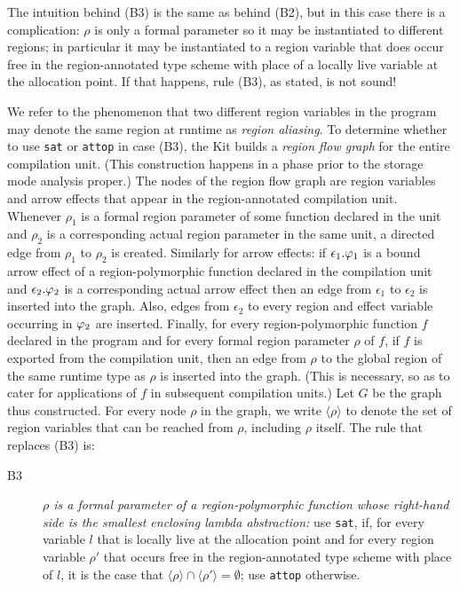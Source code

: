 \documentclass[12pt]{book}
\begin{document}
The intuition behind (B3) is the same as behind (B2), but
in this case there is a complication: 
$\rho$ is only a formal parameter so it may
be instantiated to different regions; 
in particular it may be instantiated to 
a region variable that does occur free in the region-annotated type scheme with place of a
locally live variable at the allocation point. If that happens, 
rule (B3), as stated, is not sound!

We refer to the phenomenon that two different region variables in the
program may denote the same region at runtime as 
%
{\em region aliasing}. To determine whether to use {\tt sat}
or {\tt attop} in case (B3), the Kit builds a 
%
\label{region flow graph}%
{\em region flow graph\/} for the entire compilation unit. (This
construction happens in a phase prior to the storage mode analysis
proper.)  The nodes of the region flow graph are region variables and
arrow effects that appear in the region-annotated compilation unit.
Whenever $\rho_1$ is a formal region parameter of some function
declared in the unit and $\rho_2$ is a corresponding actual region
parameter in the same unit, a directed edge from $\rho_1$ to $\rho_2$
is created. Similarly for arrow effects: if $\epsilon_1.\varphi_1$ is a
bound arrow effect of a region-polymorphic function declared in the
compilation unit and $\epsilon_2.\varphi_2$ is a corresponding actual
arrow effect then an edge from $\epsilon_1$ to $\epsilon_2$ is
inserted into the graph.  Also, edges from $\epsilon_2$ to every
region and effect variable occurring in $\varphi_2$ are inserted.
Finally, for every region-polymorphic function $f$ declared in the
program and for every formal region parameter $\rho$ of $f$, if $f$ is
exported from the compilation unit, then an edge from $\rho$ to the
global region of the same runtime type as $\rho$ is inserted into the
graph. (This is necessary, so as to cater for applications of $f$ in
subsequent compilation units.)  Let $G$ be the graph thus constructed.
For every node $\rho$ in the graph, we write $\langle\rho\rangle$ to
denote the set of region variables that can be reached from $\rho$,
including $\rho$ itself. The rule that replaces (B3) is:
%
\begin{description}
\item[B3]{\it $\rho$ is a formal parameter of a region-polymorphic function
      whose right-hand side is the smallest enclosing lambda abstraction:}
      use {\tt sat}, if, for every variable $l$ that is locally live 
      at the allocation point and for every region variable $\rho'$
      that occurs free in the region-annotated type scheme with place of $l$, it
      is the case that $\langle\rho\rangle\cap\langle\rho'\rangle =\emptyset$;
      use {\tt attop} otherwise.
\end{description}
\medskip
\end{document}
